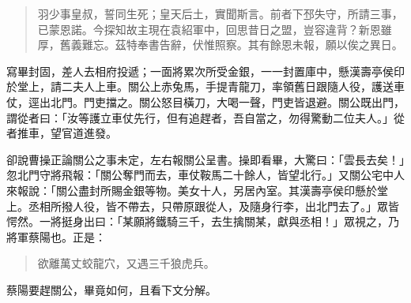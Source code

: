 \begin{quote}
羽少事皇叔，誓同生死；皇天后土，實聞斯言。前者下邳失守，所請三事，已蒙恩諾。今探知故主現在袁紹軍中，回思昔日之盟，豈容違背？新恩雖厚，舊義難忘。茲特奉書告辭，伏惟照察。其有餘恩未報，願以俟之異日。
\end{quote}

寫畢封固，差人去相府投遞；一面將累次所受金銀，一一封置庫中，懸漢壽亭侯印於堂上，請二夫人上車。關公上赤兔馬，手提青龍刀，率領舊日跟隨人役，護送車仗，逕出北門。門吏擋之。關公怒目橫刀，大喝一聲，門吏皆退避。關公既出門，謂從者曰：「汝等護立車仗先行，但有追趕者，吾自當之，勿得驚動二位夫人。」從者推車，望官道進發。

卻說曹操正論關公之事未定，左右報關公呈書。操即看畢，大驚曰：「雲長去矣！」忽北門守將飛報：「關公奪門而去，車仗鞍馬二十餘人，皆望北行。」又關公宅中人來報說：「關公盡封所賜金銀等物。美女十人，另居內室。其漢壽亭侯印懸於堂上。丞相所撥人役，皆不帶去，只帶原跟從人，及隨身行李，出北門去了。」眾皆愕然。一將挺身出曰：「某願將鐵騎三千，去生擒關某，獻與丞相！」眾視之，乃將軍蔡陽也。正是：

\begin{quote}
欲離萬丈蛟龍穴，又遇三千狼虎兵。
\end{quote}

蔡陽要趕關公，畢竟如何，且看下文分解。
